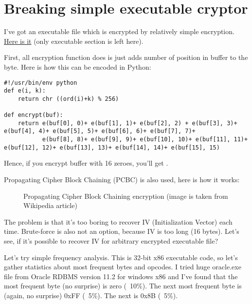 \section{Breaking simple executable cryptor}

I've got an executable file which is encrypted by relatively simple encryption.
\href{https://github.com/dennis714/yurichev.com/blob/master/blog/breaking_simple_exec_crypto/files/cipher.bin}{Here is it} (only executable section is left here).

First, all encryption function does is just adds number of position in buffer to the byte.
Here is how this can be encoded in Python:

\begin{lstlisting}[caption=Python script]
#!/usr/bin/env python
def e(i, k):
    return chr ((ord(i)+k) % 256)

def encrypt(buf):
    return e(buf[0], 0)+ e(buf[1], 1)+ e(buf[2], 2) + e(buf[3], 3)+ e(buf[4], 4)+ e(buf[5], 5)+ e(buf[6], 6)+ e(buf[7], 7)+
           e(buf[8], 8)+ e(buf[9], 9)+ e(buf[10], 10)+ e(buf[11], 11)+ e(buf[12], 12)+ e(buf[13], 13)+ e(buf[14], 14)+ e(buf[15], 15)
\end{lstlisting}

Hence, if you encrypt buffer with 16 zeroes, you'll get .

Propagating Cipher Block Chaining (PCBC) is also used, here is how it works:

\begin{figure}[H]
\centering
{}
\caption{Propagating Cipher Block Chaining encryption (image is taken from Wikipedia article)}
\end{figure}

The problem is that it's too boring to recover IV (Initialization Vector) each time.
Brute-force is also not an option, because IV is too long (16 bytes).
Let's see, if it's possible to recover IV for arbitrary encrypted executable file?

Let's try simple frequency analysis.
This is 32-bit x86 executable code, so let's gather statistics about most frequent bytes and opcodes.
I tried huge oracle.exe file from Oracle RDBMS version 11.2 for windows x86 and I've found that the most frequent byte (no surprise) is zero (~10\%).
The next most frequent byte is (again, no surprise) 0xFF (~5\%).
The next is 0x8B (~5\%).

